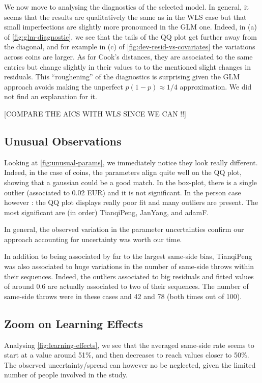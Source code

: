 \documentclass[a4paper, 12pt,oneside]{article}
\begin{document}
			We now move to analysing the diagnostics of the selected model. In general, it seems that the results are qualitatively the same as in the WLS case but that small imperfections are slightly more pronounced in the GLM one. Indeed, in (a) of \ref{fig:glm-diagnostic}, we see that the tails of the QQ plot get further away from the diagonal, and for example in (c) of \ref{fig:dev-resid-vs-covariates} the variations across coins are larger.
			As for Cook's distances, they are associated to the same entries but change slightly in their values to to the mentioned slight changes in residuals.
			This ``roughening'' of the diagnostics is surprising given the GLM approach avoids making the unperfect $p(1-p)\approx 1/4$ approximation. We did not find an explanation for it. 

			[COMPARE THE AICS WITH WLS SINCE WE CAN !!]
		\subsection{Unusual Observations}\label{sec:unusual-observations}
			Looking at \ref{fig:unusual-params}, we immediately notice they look really different. Indeed, in the case of coins, the parameters align quite well on the QQ plot, showing that a gaussian could be a good match. In the box-plot, there is a single outlier (associated to 0.02 EUR) and it is not significant. In the person case however : the QQ plot displays really poor fit and  many outliers are present. The most significant are (in order) TianqiPeng, JanYang, and adamF. 

			In general, the observed variation in the parameter uncertainties confirm our approach accounting for uncertainty was worth our time. 

			In addition to being associated by far to the largest same-side bias, TianqiPeng was also associated to huge variations in the number of same-side throws within their sequences. Indeed, the outliers associated to big residuals and fitted values of around 0.6 are actually associated to two of their sequences. The number of same-side throws were in these cases and 42 and 78 (both times out of 100). 
		\subsection{Zoom on Learning Effects}\label{sec:disc-learning-effects}
			Analysing \ref{fig:learning-effects}, we see that the averaged same-side rate seems to start at a value around 51\%, and then decreases to reach values closer to 50\%. The observed uncertainty/spread can however no be neglected, given the limited number of people involved in the study. 
			
\end{document}

